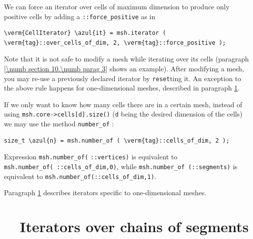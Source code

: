 We can force an iterator over cells of maximum dimension to produce only positive cells
by adding a {\small\tt {}::force\_positive} as in

\begin{Verbatim}[commandchars=\\\{\},formatcom=\small\tt,
   baselinestretch=0.94,framesep=2mm                      ]
   \verm{CellIterator} \azul{it} = msh.iterator ( \verm{tag}::over_cells_of_dim, 2, \verm{tag}::force_positive );
\end{Verbatim}

Note that it is not safe to modify a mesh while iterating over its cells
(paragraph \ref{\numb section 10.\numb parag 3} shows an example).
After modifying a mesh, you may re-use a previously declared iterator by {\small\tt reset}ting it.
An exception to the above rule happens for one-dimensional meshes, described in paragraph
\ref{\numb section 9.\numb parag 6}.

If we only want to know how many cells there are in a certain mesh,
instead of using {\small\tt msh.core->cells[d].size()} ({\small\tt d} being the desired
dimension of the cells) we may use the method {\small\tt number\_of} :

\begin{Verbatim}[commandchars=\\\{\},formatcom=\small\tt,
   baselinestretch=0.94,framesep=2mm                      ]
   size_t \azul{n} = msh.number_of ( \verm{tag}::cells_of_dim, 2 );
\end{Verbatim}

\noindent Expression {\small\tt msh.number\_of}\hskip1pt{\small\tt (}\hskip1pt
{\small\tt {}::vertices}\hskip1pt{\small\tt )} is equivalent to
\hbox{{\small\tt msh.number\_of}\hskip1pt{\small\tt (}\hskip1pt
{\small\tt {}::cells\_of\_dim,}\hskip1pt{\small\tt 0}\hskip1pt{\small\tt )}},
while {\small\tt msh.number\_of}\hskip2pt{\small\tt
(}\hskip2pt{\small\tt {}::segments}\hskip2pt{\small\tt )} is equivalent to
{\small\tt msh.number\_of}\hskip2pt{\small\tt (}\hskip2pt{\small\tt {}::cells\_of\_dim,}\hskip2pt{\small\tt 1}\hskip2pt{\small\tt )}.

Paragraph \ref{\numb section 9.\numb parag 6} describes iterators specific to one-dimensional
meshes.


\section{~~Iterators over chains of segments}\label{\numb section 9.\numb parag 6}

